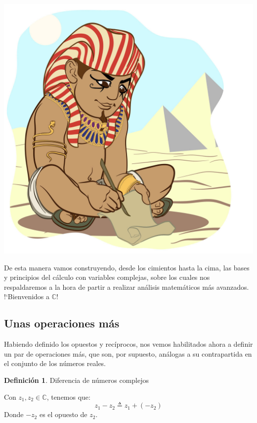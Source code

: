 \documentclass[12pt]{article}
\theoremstyle{definition}
\newtheorem{definition}{Definici\'on}[section]
\begin{document}
		
		\begin{center}
			\includegraphics[scale=0.6]{Escriba.jpg}
		\end{center}
		De esta manera vamos construyendo, desde los cimientos hasta la cima, las bases y principios del c\'alculo con variables complejas, sobre los cuales nos respaldaremos a la hora de partir a realizar an\'alisis matem\'aticos m\'as avanzados. !`Bienvenidos a $\mathbb{C}$!
 
\subsection{Unas operaciones m\'as}
	Habiendo definido los opuestos y rec\'iprocos, nos vemos habilitados ahora a definir un par de operaciones m\'as, que son, por supuesto, an\'alogas a su contrapartida en el conjunto de los n\'umeros reales.\\
	
	\colorbox{red!40!white!80}{\parbox{\linewidth}{
 	\theoremstyle{definition}
 	\begin{definition}{Diferencia de n\'umeros complejos}

	   Con $z_1, z_2 \in \mathbb{C}$, tenemos que: $$z_1 - z_2 \triangleq z_1 + (-z_2)$$
	   Donde $-z_2$ es el opuesto de $z_2$.
	 
 	\end{definition}}}
 	\linebreak
 
\end{document}
